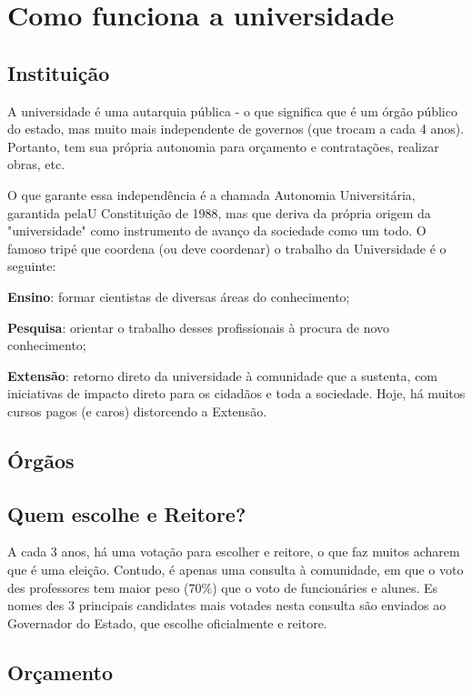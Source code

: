 \section{Como funciona a universidade}

\subsection{Instituição}

A universidade é uma autarquia pública - o que significa que é um órgão público do  estado, mas muito mais independente de governos (que trocam a cada 4 anos). Portanto, tem sua própria autonomia para orçamento e contratações, realizar obras, etc.

O que garante essa independência é a chamada Autonomia Universitária, garantida pelaU Constituição de 1988, mas que deriva da própria origem da "universidade" como
instrumento de avanço da sociedade como um todo. O famoso tripé que coordena (ou
deve coordenar) o trabalho da Universidade é o seguinte:

\textbf{Ensino}: formar cientistas de diversas áreas do conhecimento;

\textbf{Pesquisa}: orientar o trabalho desses profissionais à procura de novo conhecimento;

\textbf{Extensão}: retorno direto da universidade à comunidade que a sustenta, com iniciativas de impacto direto para os cidadãos e toda a sociedade. Hoje, há muitos cursos pagos (e caros) distorcendo a Extensão.

\subsection{Órgãos}

\subsection{Quem escolhe e Reitore?}

A cada 3 anos, há uma votação para escolher e reitore, o que faz muitos acharem que  é uma eleição. Contudo, é apenas uma consulta à comunidade, em que o voto des  professores tem maior peso (70\%) que o voto de funcionáries e alunes. Es nomes des 3  principais candidates mais votades nesta consulta são enviados ao Governador do  Estado, que escolhe oficialmente e reitore.

\subsection{Orçamento}

